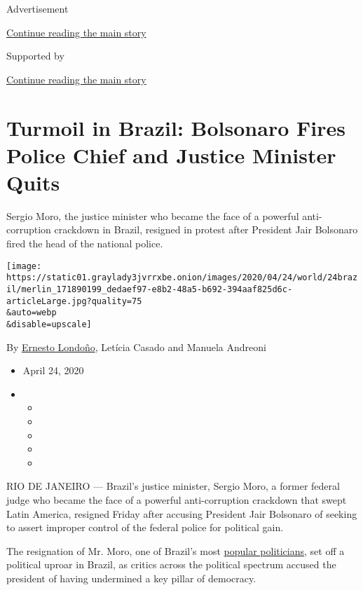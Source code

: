 Advertisement

\protect\hyperlink{after-top}{Continue reading the main story}

Supported by

\protect\hyperlink{after-sponsor}{Continue reading the main story}

\hypertarget{turmoil-in-brazil-bolsonaro-fires-police-chief-and-justice-minister-quits}{%
\section{Turmoil in Brazil: Bolsonaro Fires Police Chief and Justice
Minister
Quits}\label{turmoil-in-brazil-bolsonaro-fires-police-chief-and-justice-minister-quits}}

Sergio Moro, the justice minister who became the face of a powerful
anti-corruption crackdown in Brazil, resigned in protest after President
Jair Bolsonaro fired the head of the national police.

\texttt{[image: https://static01.graylady3jvrrxbe.onion/images/2020/04/24/world/24brazil/merlin\_171890199\_dedaef97-e8b2-48a5-b692-394aaf825d6c-articleLarge.jpg?quality=75\\\&auto=webp\\\&disable=upscale]}

By \href{https://www.nytimes3xbfgragh.onion/by/ernesto-londono}{Ernesto
Londoño}, Letícia Casado and Manuela Andreoni

\begin{itemize}
\item
  April 24, 2020
\item
  \begin{itemize}
  \item
  \item
  \item
  \item
  \item
  \end{itemize}
\end{itemize}

RIO DE JANEIRO --- Brazil's justice minister, Sergio Moro, a former
federal judge who became the face of a powerful anti-corruption
crackdown that swept Latin America, resigned Friday after accusing
President Jair Bolsonaro of seeking to assert improper control of the
federal police for political gain.

The resignation of Mr. Moro, one of Brazil's most
\href{https://www.nytimes3xbfgragh.onion/2018/11/01/world/americas/brazil-judge-lula-bolsonaro.html}{popular
politicians}, set off a political uproar in Brazil, as critics across
the political spectrum accused the president of having undermined a key
pillar of democracy.

